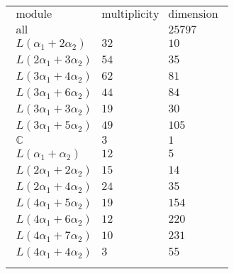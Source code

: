 \documentclass[crop,border=2mm]{standalone}
\begin{document}
\begin{tabular}{l}
$\displaystyle
\begin{array}{rll}
	\text{module}&\text{multiplicity}&\text{dimension} \\ \hline \text{all}&&25797 \\
	L\left(\alpha_{1}+ 2\alpha_{2}\right)&32&10\\
	L\left( 2\alpha_{1}+ 3\alpha_{2}\right)&54&35\\
	L\left( 3\alpha_{1}+ 4\alpha_{2}\right)&62&81\\
	L\left( 3\alpha_{1}+ 6\alpha_{2}\right)&44&84\\
	L\left( 3\alpha_{1}+ 3\alpha_{2}\right)&19&30\\
	L\left( 3\alpha_{1}+ 5\alpha_{2}\right)&49&105\\
	\mathbb{C}&3&1\\
	L\left(\alpha_{1}+\alpha_{2}\right)&12&5\\
	L\left( 2\alpha_{1}+ 2\alpha_{2}\right)&15&14\\
	L\left( 2\alpha_{1}+ 4\alpha_{2}\right)&24&35\\
	L\left( 4\alpha_{1}+ 5\alpha_{2}\right)&19&154\\
	L\left( 4\alpha_{1}+ 6\alpha_{2}\right)&12&220\\
	L\left( 4\alpha_{1}+ 7\alpha_{2}\right)&10&231\\
	L\left( 4\alpha_{1}+ 4\alpha_{2}\right)&3&55
\end{array}
$ \\ \\

\end{tabular}
\end{document}
